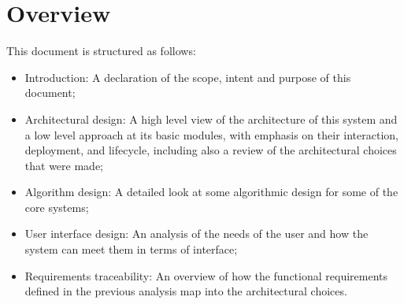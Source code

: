 \section{Overview}
This document is structured as follows:

\begin{itemize}

\item Introduction: A declaration of the scope, intent and purpose of this document;
\item Architectural design: A high level view of the architecture of this system and a low level approach at its basic modules, with emphasis on their interaction, deployment, and lifecycle, including also a review of the architectural choices that were made;
\item Algorithm design: A detailed look at some algorithmic design for some of the core systems;
\item User interface design: An analysis of the needs of the user and how the system can meet them in terms of interface;
\item Requirements traceability: An overview of how the functional requirements defined in the previous analysis map into the architectural choices.


\end{itemize}

